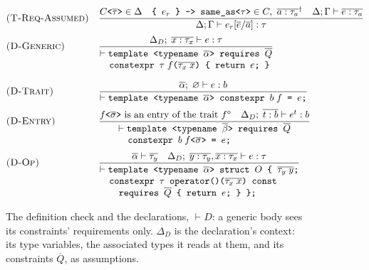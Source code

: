 \begin{figure}[htbp]
\[
\begin{array}{@{}l@{\quad}l@{}}
\textsc{(T-Req-Assumed)} & \dfrac{C\texttt{<}\overline{\tau}\texttt{>} \in \Delta \quad \texttt{\{ }e_r\texttt{ \} -> same\_as<}\tau\texttt{>} \in C,\ \overline{a : \tau_a}^{\dagger} \quad \Delta; \Gamma \vdash \overline{e : \tau_a}}{\Delta; \Gamma \vdash e_r[\overline{e}/\overline{a}] : \tau}
\\[12pt]
\textsc{(D-Generic)} & \dfrac{\Delta_D;\; \overline{x : \tau_x} \vdash e : \tau}{\begin{array}[t]{@{}l@{}}\vdash \texttt{template <typename }\overline{\alpha}\texttt{> requires } \overline{Q}\\ \quad\texttt{constexpr } \tau\; f\texttt{(}\overline{\tau_x\; x}\texttt{) \{ return } e\texttt{; \}}\end{array}}
\\[30pt]
\textsc{(D-Trait)} & \dfrac{\overline{\alpha};\; \varnothing \vdash e : b}{\vdash \texttt{template <typename }\overline{\alpha}\texttt{> constexpr } b\; f \texttt{ = } e\texttt{;}}
\\[12pt]
\textsc{(D-Entry)} & \dfrac{f\texttt{<}\overline{\sigma}\texttt{>} \text{ is an entry of the trait } f^{\diamond} \quad \Delta_D;\; \overline{t : b} \vdash e^{t} : b}{\begin{array}[t]{@{}l@{}}\vdash \texttt{template <typename }\overline{\beta}\texttt{> requires } \overline{Q}\\ \quad\texttt{constexpr } b\; f\texttt{<}\overline{\sigma}\texttt{>} \texttt{ = } e\texttt{;}\end{array}}
\\[26pt]
\textsc{(D-Op)} & \dfrac{\overline{\alpha} \vdash \overline{\tau_y} \quad \Delta_D;\; \overline{y : \tau_y}, \overline{x : \tau_x} \vdash e : \tau}{\begin{array}[t]{@{}l@{}}\vdash \texttt{template <typename }\overline{\alpha}\texttt{> struct } O \texttt{ \{ } \overline{\tau_y\; y}\texttt{;}\\ \quad\texttt{constexpr } \tau \texttt{ operator()(}\overline{\tau_x\; x}\texttt{) const}\\ \quad\quad\texttt{requires } \overline{Q} \texttt{ \{ return } e\texttt{; \} \};}\end{array}}
\end{array}
\]
\caption{The definition check and the declarations, $\vdash D$: a generic body sees its constraints' requirements only.
$\Delta_D$ is the declaration's context: its type variables, the associated types it reads at them, and its constraints $\overline{Q}$, as assumptions.
}
\end{figure}
